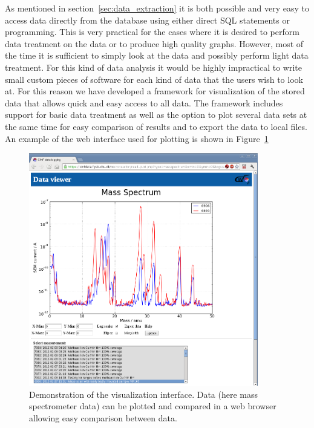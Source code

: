 As mentioned in section~\ref{sec:data_extraction} it is both possible and very
easy to access data directly from the database using either direct SQL
statements or programming. This is very practical for the cases where it is
desired to perform data treatment on the data or to produce high quality
graphs. However, most of the time it is sufficient to simply look at the data
and possibly perform light data treatment. For this kind of data analysis it
would be highly impractical to write small custom pieces of software for each
kind of data that the users wish to look at. For this reason we have developed
a framework for visualization of the stored data that allows quick and easy
access to all data. The framework includes support for basic data treatment as
well as the option to plot several data sets at the same time for easy
comparison of results and to export the data to local files. An example of the
web interface used for plotting is shown in Figure~\ref{fig:webinterface}
\begin{figure}
 \begin{center}
 \includegraphics[width=10cm]{mass_spectra_comparison.png}
 \caption{Demonstration of the visualization interface. Data (here mass
   spectrometer data) can be plotted and compared in a web browser allowing
   easy comparison between data. \label{fig:webinterface}
 } 
 \end{center}
\end{figure}

